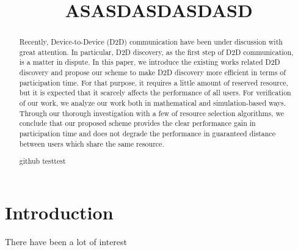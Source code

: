 \documentclass[conference]{IEEEtran}
\begin{document}
%
\title{ASASDASDASDASD}


\author{
}


\maketitle


\begin{abstract}
Recently, Device-to-Device (D2D) communication have been under discussion with great attention. In particular, D2D discovery, as the first step of D2D communication, is a matter in dispute. In this paper, we introduce the existing works related D2D discovery and propose our scheme to make D2D discovery more efficient in terms of participation time. For that purpose, it requires a little amount of reserved resource, but it is expected that it scarcely affects the performance of all users.
For verification of our work, we analyze our work both in mathematical and simulation-based ways. Through our thorough investigation with a few of resource selection algorithms, we conclude that our proposed scheme provides the clear performance gain in participation time and does not degrade the performance in guaranteed distance between users which share the same resource.

github testtest
\end{abstract}



\IEEEpeerreviewmaketitle



\section{Introduction}
There have been a lot of interest 
\end{document}
